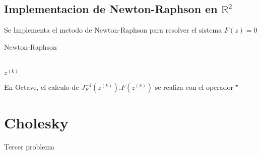 \documentclass{article}
\begin{document}
    \subsection{Implementacion de Newton-Raphson en $\mathbb{R}^2$}
    Se Implementa el metodo de Newton-Raphson para resolver el sistema $F(z) = 0$
    \begin{algorithm}[H]
        \caption{Newton-Raphson}\label{NR1}
        \small
        \centering
        \begin{algorithmic}[1]
        \EndFor \\
        \Return $z^{(k)}$
        \end{algorithmic}
    \end{algorithm}
    En Octave, el calculo de $J^{-1}_F(z^{(k)}).F(z^{(k)})$ se realiza con el operador "\"
    \subsection{}

    \subsection{}

    \subsection{}

    \section{Cholesky}
    Tercer problema

    \subsection{}

    \subsection{}

    \subsection{}

    \subsection{}
\end{document}
